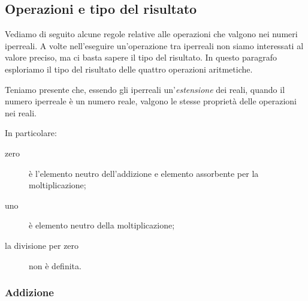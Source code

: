 \vspace{-5mm}

\subsection{Operazioni e tipo del risultato}
\label{subsec:insnum_operazioni}

Vediamo di seguito alcune regole relative alle operazioni 
che valgono nei numeri iperreali. 
A volte nell'eseguire un'operazione tra iperreali 
non siamo interessati al valore preciso, ma 
ci basta sapere il tipo del risultato. 
In questo paragrafo esploriamo il tipo del risultato delle quattro 
operazioni aritmetiche.

Teniamo presente che, essendo gli iperreali un'\emph{estensione} dei reali, 
quando il numero iperreale è un numero reale, valgono le stesse proprietà 
delle operazioni nei reali.

In particolare: 
\begin{description} %
\item [zero] è l'elemento neutro dell'addizione e 
elemento assorbente per la moltiplicazione;
\item [uno] è elemento neutro della moltiplicazione;
\item [la divisione per zero] non è definita.
\end{description}


\bigskip %
\newpage %

\subsubsection{Addizione}
\label{subsec:insnum_addizione}

